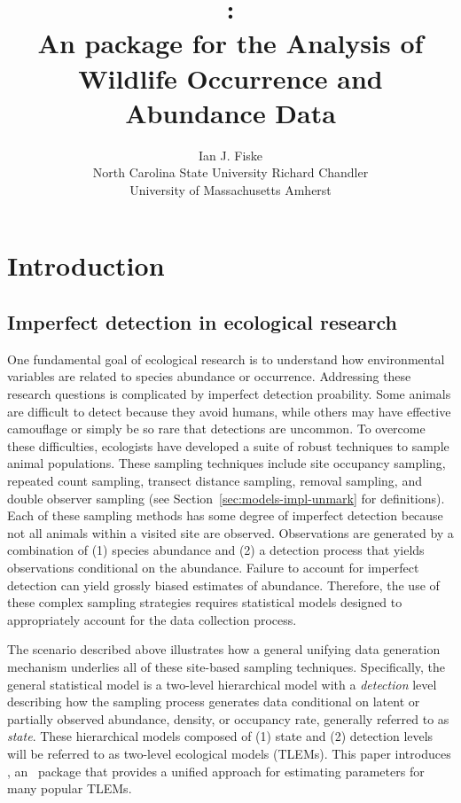 \documentclass[article,shortnames]{jss}
\author{Ian J. Fiske\\North Carolina State University \And
  Richard Chandler\\ University of Massachusetts Amherst}
\title{\pkg{unmarked}:\\
  An \proglang{R} package for the Analysis of Wildlife Occurrence and Abundance Data}
\newcommand{\um}{\pkg{unmarked}}
\newcommand{\rlang}{\proglang{R}}
\begin{document}
\section{Introduction}


\subsection{Imperfect detection in ecological research}

One fundamental goal of ecological research is to understand how
environmental variables are related to species abundance or
occurrence.  Addressing these research questions is 
complicated by imperfect detection proability. 
Some animals are difficult to detect because they avoid humans, while others
may have effective camouflage
or simply be so rare that detections are uncommon.  To overcome these
difficulties, ecologists have developed a suite of robust techniques to
sample animal populations.  %
These sampling techniques include site occupancy sampling, 
repeated count sampling, transect distance sampling, removal sampling, and 
double observer sampling (see Section~\ref{sec:models-impl-unmark} for 
definitions).  Each of these
sampling methods has some degree of imperfect detection because not
all animals within a visited site are observed.  Observations are
generated by a combination of (1) species abundance and (2) a
detection process that yields observations conditional on the
abundance.  Failure to account for imperfect detection can yield
grossly biased estimates of abundance.  Therefore, the use of these
complex sampling strategies %
requires %
statistical models %
designed to appropriately account for the data collection process.

The scenario described above illustrates how a general unifying data
generation mechanism underlies all of these site-based sampling
techniques.  Specifically, the general statistical model is a
two-level hierarchical model with a \emph{detection} level describing
how the sampling process generates data conditional on latent or
partially observed abundance, density, or occupancy rate, generally
referred to as \emph{state}.  These hierarchical models composed of
(1) state and (2) detection levels will be referred to as two-level
ecological models (TLEMs).  This paper introduces 
\um, an \rlang\ package that provides a unified approach for estimating parameters
for many popular TLEMs.
\end{document}
